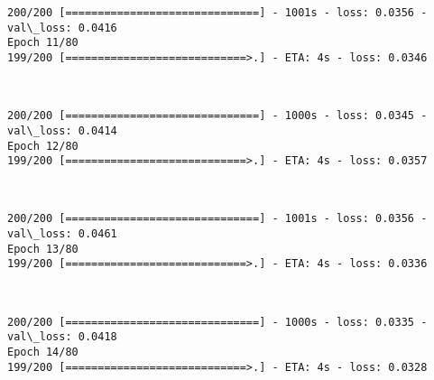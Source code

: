 \documentclass[11pt]{article}
\begin{document}
    \begin{Verbatim}[commandchars=\\\{\}]
200/200 [==============================] - 1001s - loss: 0.0356 - val\_loss: 0.0416
Epoch 11/80
199/200 [============================>.] - ETA: 4s - loss: 0.0346
    \end{Verbatim}

    \begin{center}
    \end{center}
    { \hspace*{\fill} \\}
    
    \begin{Verbatim}[commandchars=\\\{\}]
200/200 [==============================] - 1000s - loss: 0.0345 - val\_loss: 0.0414
Epoch 12/80
199/200 [============================>.] - ETA: 4s - loss: 0.0357
    \end{Verbatim}

    \begin{center}
    \end{center}
    { \hspace*{\fill} \\}
    
    \begin{Verbatim}[commandchars=\\\{\}]
200/200 [==============================] - 1001s - loss: 0.0356 - val\_loss: 0.0461
Epoch 13/80
199/200 [============================>.] - ETA: 4s - loss: 0.0336
    \end{Verbatim}

    \begin{center}
    \end{center}
    { \hspace*{\fill} \\}
    
    \begin{Verbatim}[commandchars=\\\{\}]
200/200 [==============================] - 1000s - loss: 0.0335 - val\_loss: 0.0418
Epoch 14/80
199/200 [============================>.] - ETA: 4s - loss: 0.0328
    \end{Verbatim}

    \begin{center}
    \end{center}
    { \hspace*{\fill} \\}
    
\end{document}
